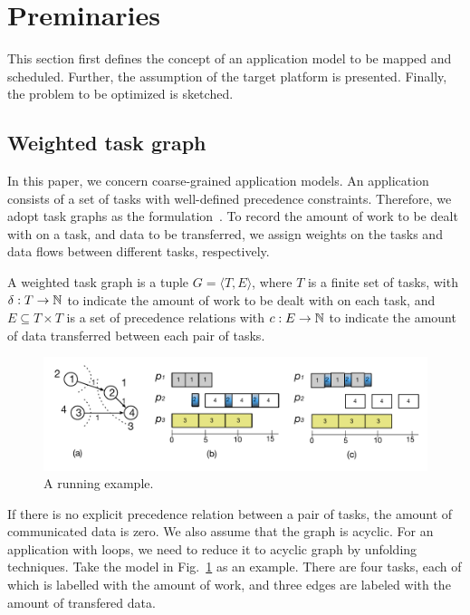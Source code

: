 \section{Preminaries\label{se:pre}}

This section first defines the concept of an application model to be mapped and scheduled. Further, the assumption of the target platform is presented. Finally, the problem to be optimized
is sketched.
\subsection{Weighted task graph}
In this paper, we concern coarse-grained application models. An application consists of a set of tasks with well-defined precedence constraints. Therefore, we adopt task graphs as the formulation~\cite{cotton2011multi}. To record the amount of work to be dealt with on a task, and data to be transferred, we assign weights on the tasks and data flows between different tasks, respectively.
\begin{defi}
A weighted task graph is a tuple $G=\langle T,E\rangle$, where $T$ is a finite set of tasks, with $\delta: T\rightarrow \mathbb{N}$ to indicate the amount of work to be dealt with on each task, and $E\subseteq T\times T$ is a set of precedence relations with $c: E\rightarrow \mathbb{N}$ to indicate the amount of data transferred between each pair of tasks.
\end{defi} 

\begin{figure}
\centering
 \includegraphics[width=0.85\columnwidth]{figures/taskgraph}
  \caption{A running example.}
 \label{fig:taskgraph}
 \vspace{-6.5mm}
 \end{figure}
 If there is no explicit precedence relation between a pair of tasks, the amount of communicated data is zero.  
 We also assume that the graph is acyclic. For an application with loops, we need to reduce it to acyclic graph by unfolding techniques. Take the model in Fig.~\ref{fig:taskgraph} as an example. There are four tasks, each of which is labelled with the amount of work, and three edges are labeled with the amount of transfered data. 

